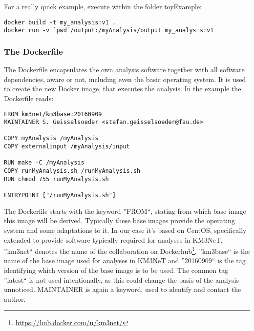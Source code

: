 \documentclass[a4paper, twoside, 11pt]{article}
\begin{document}
For a really quick example, execute within the folder toyExample:
\begin{lstlisting}[basicstyle=\footnotesize\ttfamily,frame=single]
docker build -t my_analysis:v1 .
docker run -v `pwd`/output:/myAnalysis/output my_analysis:v1
\end{lstlisting}

\subsubsection{The Dockerfile}
\label{sec:dockerfile}

The Dockerfile encapsulates the own analysis software together 
with all software dependencies, aware or not, 
including even the basic operating system.
It is used to create the new Docker image, that executes the analysis. 
In the example the Dockerfile reads: 
\begin{lstlisting}[basicstyle=\footnotesize\ttfamily,frame=single]
FROM km3net/km3base:20160909
MAINTAINER S. Geisselsoeder <stefan.geisselsoeder@fau.de>

COPY myAnalysis /myAnalysis
COPY externalinput /myAnalysis/input 

RUN make -C /myAnalysis
COPY runMyAnalysis.sh /runMyAnalysis.sh
RUN chmod 755 runMyAnalysis.sh

ENTRYPOINT ["/runMyAnalysis.sh"]
\end{lstlisting}

The Dockerfile starts with the keyword ''FROM``, 
stating from which base image this image will be derived.
Typically these base images provide the operating system and some adaptations to it. 
In our case it's based on CentOS, 
specifically extended to provide software typically required for analyses in KM3NeT. 
''km3net`` denotes the name of the collaboration on Dockerhub\footnote{\url{https://hub.docker.com/u/km3net/}}, 
''km3base`` is the name of the base image used for analyses in KM3NeT and 
''20160909`` is the tag identifying which version of the base image is to be used. 
The common tag ''latest`` is not used intentionally, as this could change the basis of the analysis unnoticed. 
MAINTAINER is again a keyword, used to identify and contact the author. 

\label{sec:addingYourCode}
\end{document}
